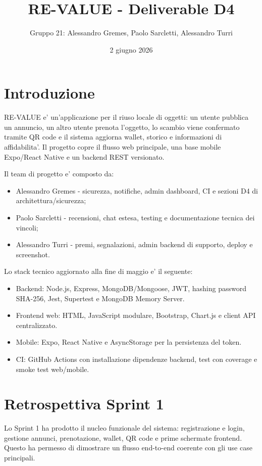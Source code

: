 \documentclass[11pt,a4paper]{article}
\title{RE-VALUE - Deliverable D4}
\author{Gruppo 21: Alessandro Gremes, Paolo Sarcletti, Alessandro Turri}
\date{2 giugno 2026}
\begin{document}
\maketitle

\section{Introduzione}

RE-VALUE e' un'applicazione per il riuso locale di oggetti: un utente pubblica un annuncio, un altro utente prenota l'oggetto, lo scambio viene confermato tramite QR code e il sistema aggiorna wallet, storico e informazioni di affidabilita'. Il progetto copre il flusso web principale, una base mobile Expo/React Native e un backend REST versionato.

Il team di progetto e' composto da:

\begin{itemize}
  \item Alessandro Gremes - sicurezza, notifiche, admin dashboard, CI e sezioni D4 di architettura/sicurezza;
  \item Paolo Sarcletti - recensioni, chat estesa, testing e documentazione tecnica dei vincoli;
  \item Alessandro Turri - premi, segnalazioni, admin backend di supporto, deploy e screenshot.
\end{itemize}

Lo stack tecnico aggiornato alla fine di maggio e' il seguente:

\begin{itemize}
  \item Backend: Node.js, Express, MongoDB/Mongoose, JWT, hashing password SHA-256, Jest, Supertest e MongoDB Memory Server.
  \item Frontend web: HTML, JavaScript modulare, Bootstrap, Chart.js e client API centralizzato.
  \item Mobile: Expo, React Native e AsyncStorage per la persistenza del token.
  \item CI: GitHub Actions con installazione dipendenze backend, test con coverage e smoke test web/mobile.
\end{itemize}

\section{Retrospettiva Sprint 1}

Lo Sprint 1 ha prodotto il nucleo funzionale del sistema: registrazione e login, gestione annunci, prenotazione, wallet, QR code e prime schermate frontend. Questo ha permesso di dimostrare un flusso end-to-end coerente con gli use case principali.
\end{document}
